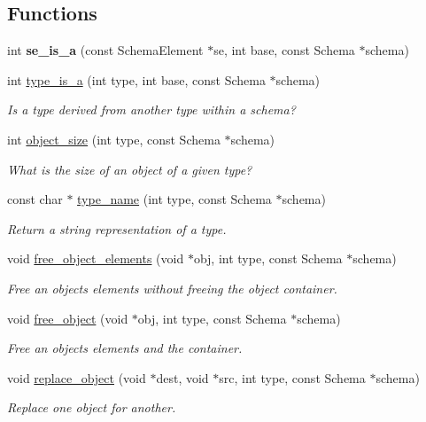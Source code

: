 \subsection*{Functions}
\begin{DoxyCompactItemize}
\item 
\mbox{\label{group__schema_ga293c4bf89890fd3439dd400cc2ac6102}} 
int {\bfseries se\+\_\+is\+\_\+a} (const Schema\+Element $\ast$se, int base, const Schema $\ast$schema)
\item 
int \hyperlink{group__schema_ga16de35ef559b5cc37cf33dd647ceb366}{type\+\_\+is\+\_\+a} (int type, int base, const Schema $\ast$schema)
\begin{DoxyCompactList}\small\item\em Is a type derived from another type within a schema? \end{DoxyCompactList}\item 
int \hyperlink{group__schema_ga4c9e71b8c2112dfc32414022942618de}{object\+\_\+size} (int type, const Schema $\ast$schema)
\begin{DoxyCompactList}\small\item\em What is the size of an object of a given type? \end{DoxyCompactList}\item 
const char $\ast$ \hyperlink{group__schema_gae3861a7135e24f7b3c648abe34e644a8}{type\+\_\+name} (int type, const Schema $\ast$schema)
\begin{DoxyCompactList}\small\item\em Return a string representation of a type. \end{DoxyCompactList}\item 
void \hyperlink{group__schema_gac3b76ccf2dbe0879a4445d3b7ebd1eba}{free\+\_\+object\+\_\+elements} (void $\ast$obj, int type, const Schema $\ast$schema)
\begin{DoxyCompactList}\small\item\em Free an object\textquotesingle{}s elements without freeing the object container. \end{DoxyCompactList}\item 
void \hyperlink{group__schema_gaff2eea92a7727eb0f66bfa00ab05b080}{free\+\_\+object} (void $\ast$obj, int type, const Schema $\ast$schema)
\begin{DoxyCompactList}\small\item\em Free an object\textquotesingle{}s elements and the container. \end{DoxyCompactList}\item 
void \hyperlink{group__schema_gadec1b0417cb8f2c7ee7075d5be5e09c1}{replace\+\_\+object} (void $\ast$dest, void $\ast$src, int type, const Schema $\ast$schema)
\begin{DoxyCompactList}\small\item\em Replace one object for another. \end{DoxyCompactList}\end{DoxyCompactItemize}



